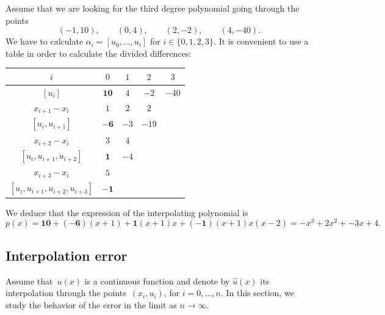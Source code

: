 \begin{example}
    Assume that we are looking for the third degree polynomial going through the points
    \[
        (-1, 10), \qquad (0, 4), \qquad (2, -2), \qquad (4, -40).
    \]
    We have to calculate $\alpha_i = [u_0, \dotsc, u_i]$ for $i \in \{0, 1, 2, 3\}$.
    It is convenient to use a table in order to calculate the divided differences:
    \begin{center}
    \begin{tabular}{|c|c|c|c|c|}
        \hline
        $i$ & $0$ & $1$ & $2$ & $3$ \\ \hline
        $[u_i]$ & $\mathbf{10}$ & $4$ & $-2$ & $-40$ \\ \hline
        $x_{i+1} - x_{i}$ & $1$ & $2$ & $2$ &  \\ \hline
        $[u_i, u_{i+1}]$ & $\mathbf{-6}$ & $-3$ & $-19$ &  \\ \hline
        $x_{i+2} - x_{i}$ & $3$ & $4$ &  &  \\ \hline
        $[u_i, u_{i+1}, u_{i+2}]$ & $\mathbf{1}$ & $-4$ & & \\ \hline
        $x_{i+3} - x_{i}$ & $5$  & &  &  \\ \hline
        $[u_i, u_{i+1}, u_{i+2}, u_{i+3}]$ & $\mathbf{-1}$ & & & \\ \hline
    \end{tabular}
    \end{center}
    We deduce that the expression of the interpolating polynomial is
    \[
        p(x)
        = \mathbf{10} + (\mathbf{-6})(x+1) + \mathbf{1} (x+1)x + (\mathbf{-1}) (x+1)x(x-2)
        = - x^3 + 2 x^2 + -3x + 4.
    \]
\end{example}

\subsection{Interpolation error}
Assume that~$u(x)$ is a continuous function and denote by $\widehat u(x)$ its interpolation through the points~$(x_i, u_i)$,
for $i = 0, \dotsc, n$.
In this section, we study the behavior of the error in the limit as $n \to \infty$.

